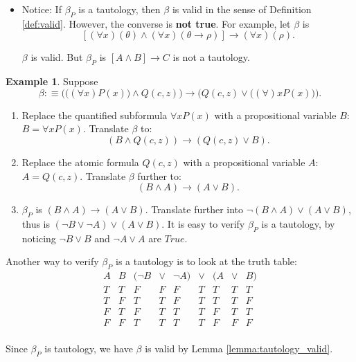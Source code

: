 \documentclass[11pt,letterpaper]{book}
\theoremstyle{definition}
\newtheorem{example}{Example}[section]
\begin{document}
\begin{itemize}
\item{Notice: If $\beta_{P}$ is a tautology, then $\beta$ is valid in
the sense of
Definition \ref{def:valid}. However, the converse is \textbf{not true}.
For example, let $\beta $ is $$ [ (\forall x) (\theta) \land (\forall x)
(\theta \rightarrow \rho) ] \rightarrow (\forall x) (\rho). $$

$\beta$ is valid. But $\beta_{P}$ is $[A \land B] \rightarrow C$ is not
a tautology.

}
\end{itemize}

\begin{example}
Suppose
$$\beta : \equiv \bigg( \big( (\forall x) P(x) \big) \land Q(c, z)
\bigg) \rightarrow \bigg( Q(c,
z) \lor \big( (\forall  )x P(x) \big) \bigg) .$$
\begin{enumerate}
\item{Replace the quantified subformula $\forall x P(x)$ with a
propositional variable $B$: $B = \forall x P(x)$. Translate $\beta$ to:
$$( B \land Q(c, z) ) \rightarrow ( Q(c, z) \lor B ) . $$
}
\item{Replace the atomic formula $Q(c, z)$ with a propositional variable
$A$: $A = Q(c, z)$. Translate $\beta$ further to:
$$( B \land A ) \rightarrow ( A \lor B ) .  $$
}
\item{$\beta_{P}$ is $( B \land A ) \rightarrow ( A \lor B )$. Translate
further into $\lnot (B \land A) \lor (A \lor B)$, thus is $(\lnot B \lor
\lnot A) \lor (A \lor B)$. It is easy to verify $\beta_P$ is a
tautology, by noticing $\lnot B \lor B$ and $\lnot A \lor A$ are $True$.}
\end{enumerate}

Another way to verify $\beta_P$ is a tautology is to look at the truth
table:
\begin{equation}
\begin{array}{cc|ccc||c||ccc}
A & B & (\lnot B & \lor & \lnot A ) & \lor & ( A & \lor & B ) \\
\hline
T & T & F & F & F & T & T & T & T \\
T & F & T & T & F & T & T & T & F \\
F & T & F & T & T & T & F & T & T \\
F & F & T & T & T & T & F & F & F \\
\end{array} \nonumber
\end{equation}

Since $\beta_{P}$ is tautology, we have $\beta$ is valid by Lemma
\ref{lemma:tautology_valid}.

\end{example}
\end{document}
